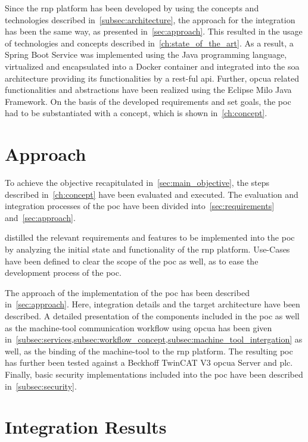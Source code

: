 \documentclass[
a4paper,
twoside,
headsepline,
cleardoublepage=empty,
parskip=half,
draft=false
]{scrbook}
\begin{document}
			Since the \gls{rnp} platform has been developed by using the concepts and technologies described in~\cref{subsec:architecture}, the approach for the integration has been the same way, as presented in~\cref{sec:approach}. This resulted in the usage of technologies and concepts described in~\cref{ch:state_of_the_art}. As a result, a Spring Boot Service was implemented using the Java programming language, virtualized and encapsulated into a Docker container and integrated into the \gls{soa} architecture providing its functionalities by a \gls{rest}-ful \gls{api}. Further, \gls{opcua} related functionalities and abstractions have been realized using the Eclipse Milo Java Framework. 
			On the basis of the developed requirements and set goals, the \gls{poc} had to be substantiated with a concept, which is shown in~\cref{ch:concept}.
		
		\section{Approach}\label{sec:discussion_approach}
		
			To achieve the objective recapitulated in~\cref{sec:main_objective}, the steps described in~\cref{ch:concept} have been evaluated and executed. The evaluation and integration processes of the \gls{poc} have been divided into~\cref{sec:requirements} and~\cref{sec:approach}.
			
			 distilled the relevant requirements and features to be implemented into the \gls{poc} by analyzing the initial state and functionality of the \gls{rnp} platform. Use-Cases have been defined to clear the scope of the \gls{poc} as well, as to ease the development process of the \gls{poc}.
			
			The approach of the implementation of the \gls{poc} has been described in~\cref{sec:approach}. Here, integration details and the target architecture have been described. A detailed presentation of the components included in the \gls{poc} as well as the machine-tool communication workflow using \gls{opcua} has been given in~\cref{subsec:services,subsec:workflow_concept,subsec:machine_tool_intergation} as well, as the binding of the machine-tool to the \gls{rnp} platform. 
			The resulting \gls{poc} has further been tested against a Beckhoff TwinCAT V3 \gls{opcua} Server and \gls{plc}.
			Finally, basic security implementations included into the \gls{poc} have been described in~\cref{subsec:security}.
			
		\section{Integration Results}\label{sec:integration_results}
\end{document}
